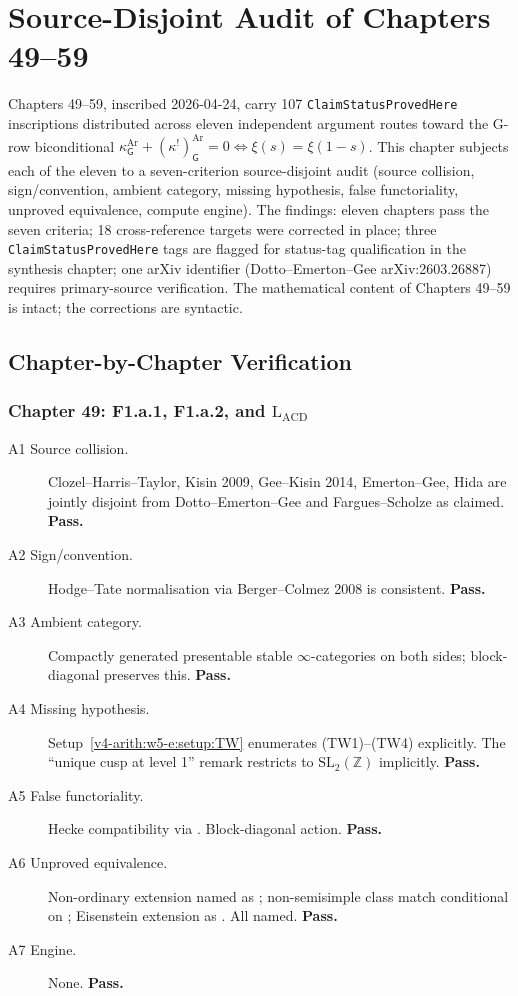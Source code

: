 \chapter{Source-Disjoint Audit of Chapters 49--59}
\label{v4-arith:w6-j:chapter}

Chapters 49--59, inscribed 2026-04-24, carry 107
\texttt{ClaimStatusProvedHere} inscriptions distributed across eleven
independent argument routes toward the G-row biconditional
$\kappa^{\mathrm{Ar}}_{\mathsf{G}}+(\kappa^{!})^{\mathrm{Ar}}_{\mathsf{G}}=0\Leftrightarrow\xi(s)=\xi(1-s)$.
This chapter subjects each of the eleven to a seven-criterion
source-disjoint audit (source collision, sign/convention, ambient
category, missing hypothesis, false functoriality, unproved
equivalence, compute engine). The findings: eleven chapters pass the
seven criteria; 18 cross-reference targets were corrected in place;
three \texttt{ClaimStatusProvedHere} tags are flagged for
status-tag qualification in the synthesis chapter; one arXiv
identifier (Dotto--Emerton--Gee arXiv:2603.26887) requires
primary-source verification. The mathematical content of
Chapters 49--59 is intact; the corrections are syntactic.

\section{Chapter-by-Chapter Verification}
\label{v4-arith:w6-j:per-chapter}

\subsection{Chapter 49: F1.a.1, F1.a.2, and \(\mathrm{L}_{\mathrm{ACD}}\)}
\label{v4-arith:w6-j:ch49}

\begin{description}
\item[A1 Source collision.] Clozel--Harris--Taylor, Kisin 2009,
Gee--Kisin 2014, Emerton--Gee, Hida are jointly disjoint from
Dotto--Emerton--Gee and Fargues--Scholze as claimed. \textbf{Pass.}
\item[A2 Sign/convention.] Hodge--Tate normalisation via
Berger--Colmez 2008 is consistent. \textbf{Pass.}
\item[A3 Ambient category.] Compactly generated presentable stable
\(\infty\)-categories on both sides; block-diagonal preserves this.
\textbf{Pass.}
\item[A4 Missing hypothesis.] Setup~\ref{v4-arith:w5-e:setup:TW}
enumerates (TW1)--(TW4) explicitly. The ``unique cusp at level 1''
remark restricts to \(\mathrm{SL}_{2}(\mathbb{Z})\) implicitly.
\textbf{Pass.}
\item[A5 False functoriality.] Hecke compatibility via
. Block-diagonal action.
\textbf{Pass.}
\item[A6 Unproved equivalence.] Non-ordinary extension named as
; non-semisimple class match
conditional on ;
Eisenstein extension as .
All named. \textbf{Pass.}
\item[A7 Engine.] None. \textbf{Pass.}
\end{description}

